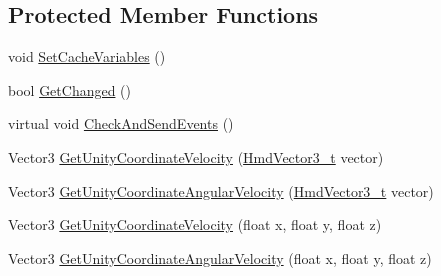 \subsection*{Protected Member Functions}
\begin{DoxyCompactItemize}
\item 
void \mbox{\hyperlink{class_valve_1_1_v_r_1_1_steam_v_r___action___pose___source_aa488ac2a5021efb184e4b335188944e4}{Set\+Cache\+Variables}} ()
\item 
bool \mbox{\hyperlink{class_valve_1_1_v_r_1_1_steam_v_r___action___pose___source_afc0592915bfe736886dad8e8b97cbd7f}{Get\+Changed}} ()
\item 
virtual void \mbox{\hyperlink{class_valve_1_1_v_r_1_1_steam_v_r___action___pose___source_a3a0883dd58cb29e7cf549199e858c69f}{Check\+And\+Send\+Events}} ()
\item 
Vector3 \mbox{\hyperlink{class_valve_1_1_v_r_1_1_steam_v_r___action___pose___source_ab1ead535aac907d57cc7e064f34a6ea0}{Get\+Unity\+Coordinate\+Velocity}} (\mbox{\hyperlink{struct_valve_1_1_v_r_1_1_hmd_vector3__t}{Hmd\+Vector3\+\_\+t}} vector)
\item 
Vector3 \mbox{\hyperlink{class_valve_1_1_v_r_1_1_steam_v_r___action___pose___source_a836f6fa0ef1c1c8d8bc4334607643f1b}{Get\+Unity\+Coordinate\+Angular\+Velocity}} (\mbox{\hyperlink{struct_valve_1_1_v_r_1_1_hmd_vector3__t}{Hmd\+Vector3\+\_\+t}} vector)
\item 
Vector3 \mbox{\hyperlink{class_valve_1_1_v_r_1_1_steam_v_r___action___pose___source_a368631c6e4ff2b5fb92ef7903e5ef992}{Get\+Unity\+Coordinate\+Velocity}} (float x, float y, float z)
\item 
Vector3 \mbox{\hyperlink{class_valve_1_1_v_r_1_1_steam_v_r___action___pose___source_a154bbe58d5e9307ffe84b0bf68c3d79a}{Get\+Unity\+Coordinate\+Angular\+Velocity}} (float x, float y, float z)
\end{DoxyCompactItemize}

